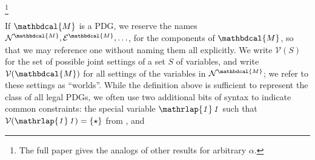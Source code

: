 \documentclass[letterpaper]{article} %
\theoremstyle{plain}
\theoremstyle{definition}
\theoremstyle{remark}
\newcommand{\vleftovers}[1]{{\color{vleftoverscolor} #1}}
\renewcommand{\vleftovers}[1]{} %
\newcommand\mat[1]{\mathbf{#1}}
\newcommand{\V}{\mathcal V}
\newcommand{\N}{\mathcal N}
\newcommand{\Ed}{\mathcal E}
\newcommand{\dg}[1]{\mathbdcal{#1}}
\newcommand{\pdgunit}{\mathrlap{\mathit 1} \mspace{2.3mu}\mathit 1}
\newcommand{\Gr}{\mathcal G}
\begin{document}
\begin{defn}
\footnote{The full paper gives the analogs of other results for arbitrary $\alpha$.}
% 
\end{defn}
If $\dg M$ is a PDG, we reserve the names 
$\N^{\dg M}, \Ed^{\dg M}, \ldots$,
for the components of $\dg M$, so that we may reference one without naming them
all explicitly. We write $\V(S)$ for the set of possible joint settings of a set
$S$ of variables, and write
$\V(\dg M)$ for all settings of the variables in $\N^{\dg M}$; we
refer  to these settings as ``worlds''.
While the definition above is sufficient to represent the class of all legal
PDGs, we often use two additional bits of syntax
to indicate common constraints:  
the special variable $\pdgunit$ such that $\V(\pdgunit)=\{\star\}$
from , and
\vleftovers{
		\begin{example}\label{ex:worldsonly}
			A probability distribution $p$ over a measurable set $W$ of possible worlds is represented as 
			\begin{center}
				\scalebox{0.8}{
				\begin{tikzpicture}
					\node[dpadded] (1) at (0,0) {$\sf 1$};
					\node[dpadded] (W) at (3,0) {$W$};

					\draw[arr] (1) to node[fill=white]{$p$} (W);
				\end{tikzpicture}}
			\end{center}
		\end{example}
}%
\end{document}
